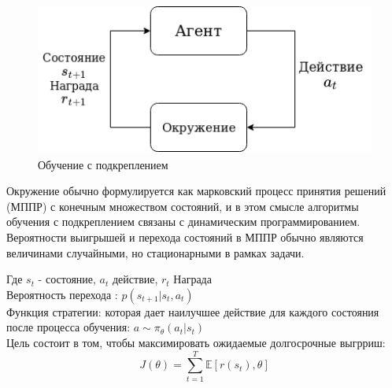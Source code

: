 \documentclass[a4paper,12pt]{article}
\begin{document}
\begin{figure}[H]
    \centering
    \includegraphics[height=5cm]{img/RL_ru.png}
    \caption{Обучение с подкреплением}
    \label{fig:my_label}
\end{figure}

Окружение обычно формулируется как марковский процесс принятия решений (МППР) с конечным множеством состояний, и в этом смысле алгоритмы обучения с подкреплением связаны с динамическим программированием. Вероятности выигрышей и перехода состояний в МППР обычно являются величинами случайными, но стационарными в рамках задачи.
\begin{center}
\end{center}
Где $s_t$ - состояние, $a_t$ действие, $r_t$ Награда  \\
Вероятность перехода : $p(s_{t+1}|s_t,a_t)$ \\
Функция стратегии: которая дает наилучшее действие для каждого состояния после процесса обучения: $a \sim \pi_\theta (a_t|s_t)$\\
Цель состоит в том, чтобы максимировать ожидаемые долгосрочные выгрриш:
$$J (\theta)=\sum_{t=1}^{T} \mathbb{E} [r (s_t), \theta]$$
\newpage
\end{document}
